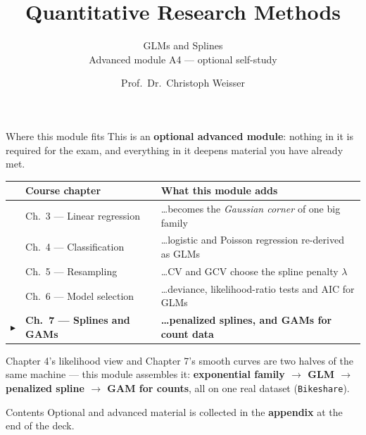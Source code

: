 \documentclass[aspectratio=169,11pt]{beamer}
\title{Quantitative Research Methods}
\subtitle{GLMs and Splines\\[2pt]{\small Advanced module A4 --- optional self-study}}
\author{Prof.\ Dr.\ Christoph Weisser}
\date{}\graphicspath{{images/}}
\begin{document}
\begin{frame}[plain]\titlepage\end{frame}

\begin{frame}{Where this module fits}
  \footnotesize
  This is an \textbf{optional advanced module}: nothing in it is required for the exam,
  and everything in it deepens material you have already met.
  \begin{center}
  \begin{tabular}{@{}c l l@{}}
    & \textbf{Course chapter} & \textbf{What this module adds} \\
    \midrule
    & Ch.\ 3 --- Linear regression & \ldots{}becomes the \emph{Gaussian corner} of one big family \\
    & Ch.\ 4 --- Classification & \ldots{}logistic and Poisson regression re-derived as GLMs \\
    & Ch.\ 5 --- Resampling & \ldots{}CV and GCV choose the spline penalty $\lambda$ \\
    & Ch.\ 6 --- Model selection & \ldots{}deviance, likelihood-ratio tests and AIC for GLMs \\
    $\blacktriangleright$ & \textbf{Ch.\ 7 --- Splines and GAMs} & \textbf{\ldots{}penalized splines, and GAMs for count data} \\
  \end{tabular}
  \end{center}
  \vspace{2pt}
  \begin{takeaway}
    Chapter 4's likelihood view and Chapter 7's smooth curves are two halves of the same
    machine --- this module assembles it: \textbf{exponential family $\to$ GLM $\to$
    penalized spline $\to$ GAM for counts}, all on one real dataset (\texttt{Bikeshare}).
  \end{takeaway}
\end{frame}

\begin{frame}{Contents}\small\tableofcontents[hideallsubsections]
  \vfill
  {\tiny Optional and advanced material is collected in the \textbf{appendix} at the end of the deck.}
\end{frame}
\end{document}
